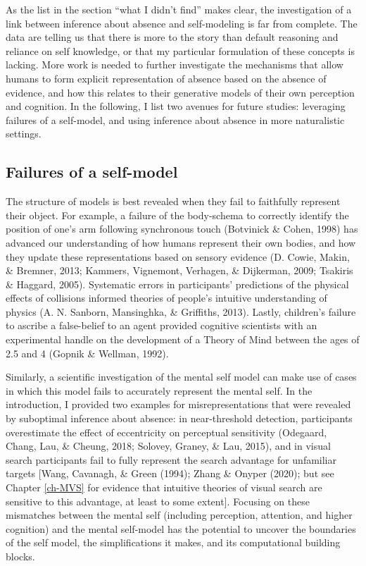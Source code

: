 \documentclass[12pt,twoside]{reedthesis}
\begin{document}
As the list in the section ``what I didn't find'' makes clear, the investigation of a link between inference about absence and self-modeling is far from complete. The data are telling us that there is more to the story than default reasoning and reliance on self knowledge, or that my particular formulation of these concepts is lacking. More work is needed to further investigate the mechanisms that allow humans to form explicit representation of absence based on the absence of evidence, and how this relates to their generative models of their own perception and cognition. In the following, I list two avenues for future studies: leveraging failures of a self-model, and using inference about absence in more naturalistic settings.

\hypertarget{failures}{%
\subsection*{Failures of a self-model}\label{failures}}

The structure of models is best revealed when they fail to faithfully represent their object. For example, a failure of the body-schema to correctly identify the position of one's arm following synchronous touch (Botvinick \& Cohen, 1998) has advanced our understanding of how humans represent their own bodies, and how they update these representations based on sensory evidence (D. Cowie, Makin, \& Bremner, 2013; Kammers, Vignemont, Verhagen, \& Dijkerman, 2009; Tsakiris \& Haggard, 2005). Systematic errors in participants' predictions of the physical effects of collisions informed theories of people's intuitive understanding of physics (A. N. Sanborn, Mansinghka, \& Griffiths, 2013). Lastly, children's failure to ascribe a false-belief to an agent provided cognitive scientists with an experimental handle on the development of a Theory of Mind between the ages of 2.5 and 4 (Gopnik \& Wellman, 1992).

Similarly, a scientific investigation of the mental self model can make use of cases in which this model fails to accurately represent the mental self. In the introduction, I provided two examples for misrepresentations that were revealed by suboptimal inference about absence: in near-threshold detection, participants overestimate the effect of eccentricity on perceptual sensitivity (Odegaard, Chang, Lau, \& Cheung, 2018; Solovey, Graney, \& Lau, 2015), and in visual search participants fail to fully represent the search advantage for unfamiliar targets {[}Wang, Cavanagh, \& Green (1994); Zhang \& Onyper (2020); but see Chapter \ref{ch-MVS} for evidence that intuitive theories of visual search are sensitive to this advantage, at least to some extent{]}. Focusing on these mismatches between the mental self (including perception, attention, and higher cognition) and the mental self-model has the potential to uncover the boundaries of the self model, the simplifications it makes, and its computational building blocks.
\end{document}
